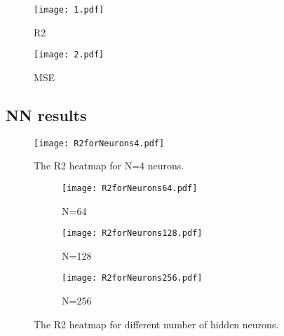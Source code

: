 \documentclass[10pt]{article}
\begin{document}
\begin{figure}
	\centerline{\texttt{[image: 1.pdf]}}
	\caption{R2}
	\label{plt:R2"}
\end{figure}

\begin{figure}
	\centerline{\texttt{[image: 2.pdf]}}
	\caption{MSE}
	\label{plt:MSE"}
\end{figure}
\subsection{NN results}

	\begin{figure}
		\centering
		\texttt{[image: R2forNeurons4.pdf]}
		\caption[ The R2 heatmap for N=4 neurons.]
		{\small The R2 heatmap for N=4 neurons.} 
		\label{fig:R2NN1}
	\end{figure}

	\begin{figure}
	\centering
			
	\begin{subfigure}[b]{0.9\textwidth}  
		\centering 
		\texttt{[image: R2forNeurons64.pdf]}
		\caption[]%
		{{\small N=64}}    
		\label{fig:mean and std of net24}
	\end{subfigure}
	\hfill
	\begin{subfigure}[b]{0.9\textwidth}   
		\centering 
		\texttt{[image: R2forNeurons128.pdf]}
		\caption[]%
		{{\small N=128}}    
		\label{fig:mean and std of net34}
	\end{subfigure}
	\quad
	\begin{subfigure}[b]{0.9\textwidth}   
		\centering 
		\texttt{[image: R2forNeurons256.pdf]}
		\caption[]%
		{{\small N=256}}    
		\label{fig:mean and std of net44}
	\end{subfigure}
	\caption[ The average and standard deviation of critical parameters ]
	{\small The R2 heatmap for different number of hidden neurons.} 
	\label{fig:mean and std of nets}
\end{figure}
\end{document}
